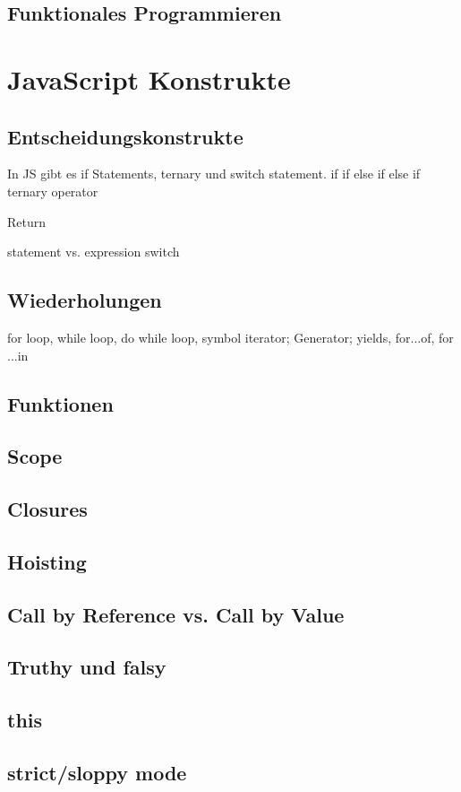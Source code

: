 \documentclass{book}
\begin{document}
\section{Funktionales Programmieren}
\chapter{JavaScript Konstrukte}
\section{Entscheidungskonstrukte}
In JS gibt es if Statements, ternary und switch statement.
if
if else
if else if 
ternary operator

Return 

statement vs. expression
switch

\section{Wiederholungen}
for loop, while loop, do while loop, symbol iterator; Generator; yields, for...of, for ...in

\section{Funktionen}

\section{Scope}
\section{Closures}
\section{Hoisting}
\section{Call by Reference vs. Call by Value}
\section{Truthy und falsy}
\section{this}
\section{strict/sloppy mode}
\end{document}

